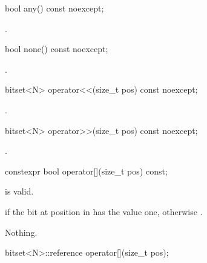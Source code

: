 %
%
\begin{itemdecl}
bool any() const noexcept;
\end{itemdecl}

\begin{itemdescr}
\pnum
\returns
{}.
\end{itemdescr}

%
\begin{itemdecl}
bool none() const noexcept;
\end{itemdecl}

\begin{itemdescr}
\pnum
\returns
{}.
\end{itemdescr}

%
\begin{itemdecl}
bitset<N> operator<<(size_t pos) const noexcept;
\end{itemdecl}

\begin{itemdescr}
\pnum
\returns
{}.
\end{itemdescr}

%
\begin{itemdecl}
bitset<N> operator>>(size_t pos) const noexcept;
\end{itemdecl}

\begin{itemdescr}
\pnum
\returns
{}.
\end{itemdescr}

%
\begin{itemdecl}
constexpr bool operator[](size_t pos) const;
\end{itemdecl}

\begin{itemdescr}
\pnum
\expects
{} is valid.

\pnum
\returns
{} if the bit at position  in  has the value
one, otherwise .

\pnum
\throws
Nothing.
\end{itemdescr}

%
\begin{itemdecl}
bitset<N>::reference operator[](size_t pos);
\end{itemdecl}

